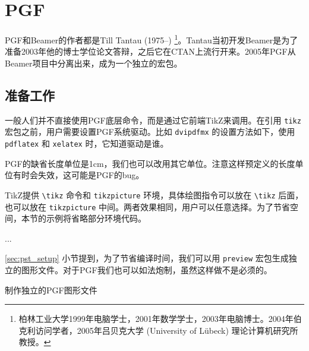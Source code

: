 \chapter{PGF}
\label{sec:pgf}

PGF和Beamer的作者都是Till Tantau (1975--)\indexTantau{} \footnote{柏林工业大学1999年电脑学士，2001年数学学士，2003年电脑博士。2004年伯克利访问学者，2005年吕贝克大学 (University of Lübeck) 理论计算机研究所教授。}。Tantau当初开发Beamer是为了准备2003年他的博士学位论文答辩，之后它在CTAN上流行开来。2005年PGF从Beamer项目中分离出来，成为一个独立的宏包\citep{Tantau_2010}。

\section{准备工作}

一般人们并不直接使用PGF底层命令，而是通过它前端TikZ来调用。在引用 \texttt{tikz} 宏包之前，用户需要设置PGF系统驱动。比如 \texttt{dvipdfmx} 的设置方法如下，使用 \texttt{pdflatex} 和 \texttt{xelatex} 时，它知道驱动是谁。

\begin{Code}[]
\def\pgfsysdriver{pgfsys-dvipdfmx.def}
\usepackage{tikz}
\end{Code}

PGF的缺省长度单位是1cm，我们也可以改用其它单位。注意这样预定义的长度单位有时会失效，这可能是PGF的bug。

\begin{Code}[]
\end{Code}

TikZ提供 \verb|\tikz| 命令和 \texttt{tikzpicture} 环境，具体绘图指令可以放在 \verb|\tikz| 后面，也可以放在 \texttt{tikzpicture} 中间。两者效果相同，用户可以任意选择。为了节省空间，本节的示例将省略部分环境代码。

\begin{Code}[]
\tikz ...   %
\end{Code}

\ref{sec:pst_setup} 小节提到，为了节省编译时间，我们可以用 \texttt{preview} 宏包生成独立的图形文件。对于PGF我们也可以如法炮制，虽然这样做不是必须的。

\begin{example}[h]
\caption{制作独立的PGF图形文件}
\label{exa:pgf}
\end{example}

